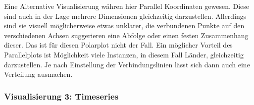 Eine Alternative Visualisierung währen hier Parallel Koordinaten gewesen. Diese sind auch in der Lage mehrere Dimensionen gleichzeitig darzustellen. Allerdings sind sie visuell möglicherweise etwas unklarer, die verbundenen Punkte auf den verschiedenen Achsen suggerieren eine Abfolge oder einen festen Zusammenhang dieser. Das ist für diesen Polarplot nicht der Fall. Ein möglicher Vorteil des Parallelplots ist Möglichkeit viele Instanzen, in diesem Fall Länder, gleichzeitig darzustellen. Je nach Einstellung der Verbindungslinien lässt sich dann auch eine Verteilung ausmachen. 

\subsubsection{Visualisierung 3: Timeseries}